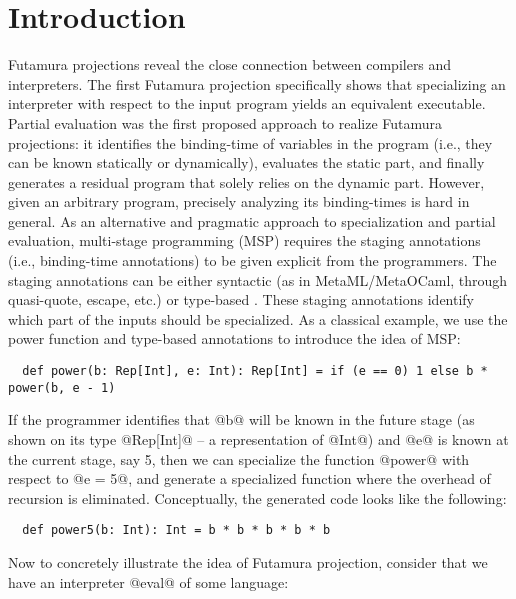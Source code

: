 \section{Introduction} \label{intro}

Futamura projections \cite{Futamura1999, futamura1971partial} reveal the close
connection between compilers and interpreters. The first Futamura projection
specifically shows that specializing an interpreter with respect to the input
program yields an equivalent executable. Partial evaluation
\cite{DBLP:books/daglib/0072559} was the first proposed approach to realize
Futamura projections: it identifies the binding-time of variables in
the program (i.e., they can be known statically or dynamically),
evaluates the static part, and finally generates a residual program that solely
relies on the dynamic part. However, given an arbitrary program, precisely
analyzing its binding-times is hard in general. As an alternative and pragmatic
approach to specialization and partial evaluation, multi-stage programming (MSP) 
\cite{taha1999multi, DBLP:conf/pepm/TahaS97} requires the staging
annotations (i.e., binding-time annotations) to be given explicit from the
programmers. The staging annotations can be either syntactic (as in
MetaML/MetaOCaml, through quasi-quote, escape, etc.) or type-based \cite{DBLP:conf/gpce/RompfO10}.
These staging annotations identify which part of the inputs should be
specialized. As a classical example, we use the power function and type-based
annotations to introduce the idea of MSP:

\begin{lstlisting}
  def power(b: Rep[Int], e: Int): Rep[Int] = if (e == 0) 1 else b * power(b, e - 1)
\end{lstlisting}

If the programmer identifies that @b@ will be known in the future stage (as shown
on its type @Rep[Int]@ -- a representation of @Int@) and @e@ is known at the
current stage, say 5, then we can specialize the function @power@ with
respect to @e = 5@, and generate a specialized function where the overhead of
recursion is eliminated. Conceptually, the generated code looks like the following:

\begin{lstlisting}
  def power5(b: Int): Int = b * b * b * b * b
\end{lstlisting}

Now to concretely illustrate the idea of Futamura projection, consider that we
have an interpreter @eval@ of some language:

